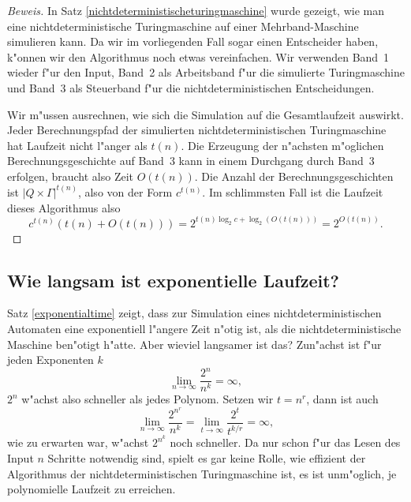 \begin{proof}[Beweis]
In Satz \ref{nichtdeterministischeturingmaschine} wurde gezeigt,
wie man eine nichtdeterministische Turingmaschine auf einer
Mehrband-Maschine simulieren kann. Da wir im vorliegenden Fall
sogar einen Entscheider haben, k"onnen wir den Algorithmus noch
etwas vereinfachen. Wir verwenden Band~1 wieder f"ur den Input,
Band~2 als Arbeitsband f"ur die simulierte Turingmaschine und
Band~3 als Steuerband f"ur die nichtdeterministischen
Entscheidungen.

Wir m"ussen ausrechnen, wie sich die Simulation auf die 
Gesamtlaufzeit auswirkt. Jeder Berechnungspfad der simulierten
nichtdeterministischen Turingmaschine hat Laufzeit nicht
l"anger als $t(n)$. Die Erzeugung der n"achsten m"oglichen
Berechnungsgeschichte auf Band~3 kann in einem Durchgang
durch Band~3 erfolgen, braucht also Zeit $O(t(n))$.
Die Anzahl der Berechnungsgeschichten ist $|Q\times \Gamma|^{t(n)}$,
also von der Form $c^{t(n)}$. Im schlimmsten Fall ist die
Laufzeit dieses Algorithmus also
\[
c^{t(n)}(t(n) + O(t(n)))
=
2^{t(n) \log_2 c+ \log_2(O(t(n)))}
=
2^{O(t(n))}.
\]
\end{proof}
\subsection{Wie langsam ist exponentielle Laufzeit?}
Satz \ref{exponentialtime} zeigt, dass zur Simulation eines
nichtdeterministischen Automaten eine exponentiell l"angere
Zeit n"otig ist, als die nichtdeterministische Maschine
ben"otigt h"atte. Aber wieviel langsamer ist das?
Zun"achst ist f"ur jeden Exponenten $k$
\[
\lim_{n\to\infty}\frac{2^{n}}{n^k}=\infty,
\]
$2^n$ w"achst also schneller als jedes Polynom. 
Setzen wir $t=n^r$, dann ist auch
\[
\lim_{n\to\infty}\frac{2^{n^r}}{n^k}
=
\lim_{t\to\infty}\frac{2^t}{t^{k/r}}
=
\infty,
\]
wie zu erwarten war, w"achst $2^{n^k}$ noch schneller.
Da nur schon f"ur das Lesen des Input $n$ Schritte notwendig sind,
spielt es gar keine Rolle, wie effizient der Algorithmus der
nichtdeterministischen Turingmaschine ist, es ist unm"oglich,
je polynomielle Laufzeit zu erreichen.

